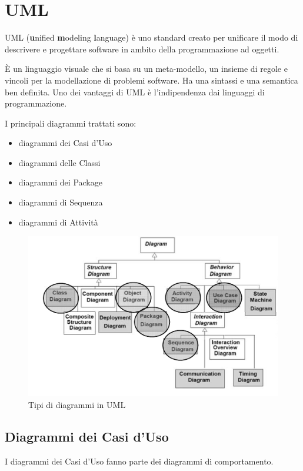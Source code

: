 \chapter{UML}
UML (\textbf{u}nified \textbf{m}odeling \textbf{l}anguage) è uno standard creato per unificare il modo di descrivere e progettare software in ambito della programmazione ad oggetti. 

\`E un linguaggio visuale che si basa su un meta-modello, un insieme di regole e vincoli per la modellazione di problemi software.
Ha una sintassi e una semantica ben definita. Uno dei vantaggi di UML è l'indipendenza dai linguaggi di programmazione.

I principali diagrammi trattati sono:
\begin{itemize}
\item diagrammi dei Casi d'Uso
\item diagrammi delle Classi
\item diagrammi dei Package
\item diagrammi di Sequenza
\item diagrammi di Attività
\end{itemize} 

\begin{figure}[H]
\centering
    \includegraphics[width=1\textwidth]{res/img/diagrammiUML}
    \caption{Tipi di diagrammi in UML}
\end{figure}

\section{Diagrammi dei Casi d'Uso}

I diagrammi dei Casi d'Uso fanno parte dei diagrammi di comportamento. 


